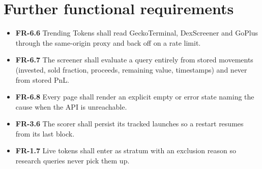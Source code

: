 \section{Further functional requirements}
\begin{itemize}[label={}]
  \item \textbf{FR-6.6} Trending Tokens shall read GeckoTerminal, DexScreener and GoPlus through the same-origin proxy and back off on a rate limit.
  \item \textbf{FR-6.7} The screener shall evaluate a query entirely from stored movements (invested, sold fraction, proceeds, remaining value, timestamps) and never from stored PnL.
  \item \textbf{FR-6.8} Every page shall render an explicit empty or error state naming the cause when the API is unreachable.
  \item \textbf{FR-3.6} The scorer shall persist its tracked launches so a restart resumes from its last block.
  \item \textbf{FR-1.7} Live tokens shall enter  as stratum  with an exclusion reason so research queries never pick them up.
\end{itemize}

